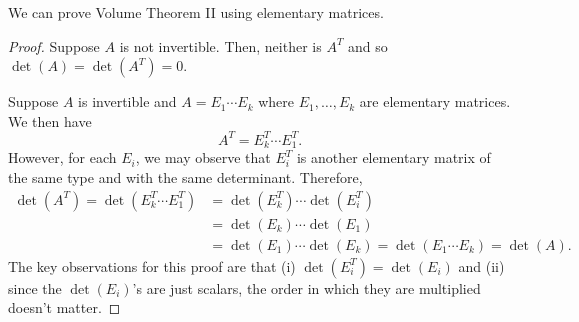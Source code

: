 We can prove Volume Theorem II using elementary matrices.
\begin{proof}
	Suppose $A$ is not invertible. Then, neither is $A^T$ and so $\det(A)=\det(A^T)=0$.

	Suppose $A$ is invertible and $A=E_1\cdots E_k$ where $E_1,\ldots, E_k$ are elementary
	matrices. We then have
	\[
		A^T = E_k^T\cdots E_1^T.
	\]
	However, for each $E_i$, we may observe that $E_i^T$ is another elementary matrix
	of the same type and with the same determinant. Therefore,
	\begin{align*}
		\det(A^T) = \det(E_k^T\cdots E_1^T)&=\det(E_k^T)\cdots \det(E_i^T)\\ 
		&=
		\det(E_k)\cdots \det(E_1)\\ &= \det(E_1)\cdots \det(E_k) = \det(E_1\cdots E_k)=\det(A).
	\end{align*}
	The key observations for this proof are that (i) $\det(E_i^T)=\det(E_i)$ and (ii) since the 
	$\det(E_i)$'s are just scalars, the order in which they are multiplied doesn't matter.
\end{proof}
